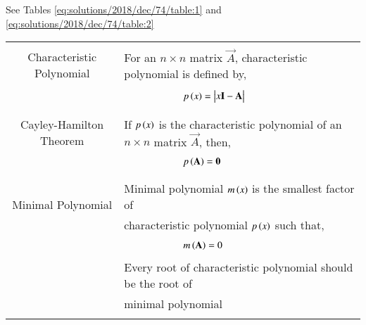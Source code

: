 See Tables \ref{eq:solutions/2018/dec/74/table:1} and \ref{eq:solutions/2018/dec/74/table:2}

\begin{table*}[ht!]
\centering
\begin{tabular}{|c|l|}
    \hline
	\multirow{3}{*}{Characteristic Polynomial} 
	& \\
	& For an $n\times n$ matrix $\vec{A}$, characteristic polynomial is defined by,\\
	&\\
	& $\qquad\qquad\qquad p\brak{x}=\mydet{x\Vec{I}-\Vec{A}}$\\
	&\\
	\hline
	\multirow{3}{*}{Cayley-Hamilton Theorem}
    &\\
    & If $p\left(x\right)$ is the characteristic polynomial of an $n\times n$ matrix $\vec{A}$, then,\\
    &\\
    &$\qquad \qquad \qquad p\left(\mathbf{A}\right)=\mathbf{0}$\\
    &\\
    \hline
	\multirow{3}{*}{Minimal Polynomial} 
	&\\
	& Minimal polynomial $m\left(x\right)$ is the smallest factor of\\
	&characteristic polynomial $p\left(x\right)$ such that,\\
	&\\
	& $\qquad \qquad \qquad m\left(\mathbf{A}\right)=0$\\
	& \\
	& Every root of characteristic polynomial should be the root of\\
	&minimal polynomial\\
	&\\
    \hline
\end{tabular}
    \caption{Definitions}
\label{eq:solutions/2018/dec/74/table:1}
\end{table*}
\onecolumn
